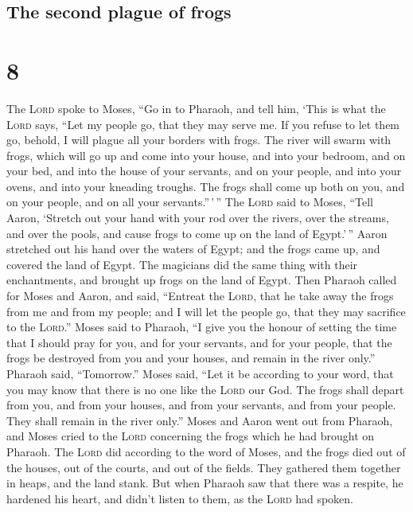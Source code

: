 \hypertarget{the-second-plague-of-frogs}{%
\subsection{The second plague of
frogs}\label{the-second-plague-of-frogs}}

\hypertarget{section-7}{%
\section{8}\label{section-7}}

 The \textsc{Lord} spoke to Moses, ``Go in to Pharaoh, and
tell him, `This is what the \textsc{Lord} says, ``Let my people go, that
they may serve me.  If you refuse to let them go, behold,
I will plague all your borders with frogs.  The river will
swarm with frogs, which will go up and come into your house, and into
your bedroom, and on your bed, and into the house of your servants, and
on your people, and into your ovens, and into your kneading troughs.
 The frogs shall come up both on you, and on your people,
and on all your servants.''\,'\,''  The \textsc{Lord} said
to Moses, ``Tell Aaron, `Stretch out your hand with your rod over the
rivers, over the streams, and over the pools, and cause frogs to come up
on the land of Egypt.'\,''  Aaron stretched out his hand
over the waters of Egypt; and the frogs came up, and covered the land of
Egypt.  The magicians did the same thing with their
enchantments, and brought up frogs on the land of Egypt. 
Then Pharaoh called for Moses and Aaron, and said, ``Entreat the
\textsc{Lord}, that he take away the frogs from me and from my people;
and I will let the people go, that they may sacrifice to the
\textsc{Lord}.''  Moses said to Pharaoh, ``I give you the
honour of setting the time that I should pray for you, and for your
servants, and for your people, that the frogs be destroyed from you and
your houses, and remain in the river only.''  Pharaoh
said, ``Tomorrow.'' Moses said, ``Let it be according to your word, that
you may know that there is no one like the \textsc{Lord} our God.
 The frogs shall depart from you, and from your houses,
and from your servants, and from your people. They shall remain in the
river only.''  Moses and Aaron went out from Pharaoh, and
Moses cried to the \textsc{Lord} concerning the frogs which he had
brought on Pharaoh.  The \textsc{Lord} did according to
the word of Moses, and the frogs died out of the houses, out of the
courts, and out of the fields.  They gathered them
together in heaps, and the land stank.  But when Pharaoh
saw that there was a respite, he hardened his heart, and didn't listen
to them, as the \textsc{Lord} had spoken.

